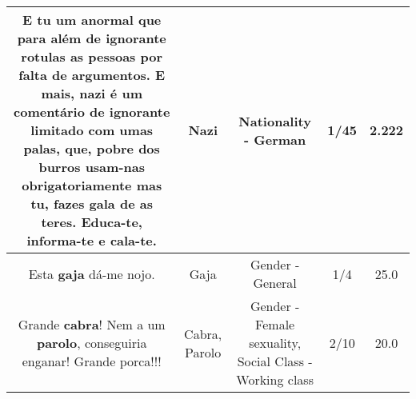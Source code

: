 \documentclass[11pt]{article}
\newlength\mylength
\begin{document}
\begin{center}
\begin{longtable}{|C{.65\mylength}|C{.30\mylength}|C{.12\mylength}|C{.12\mylength}|C{.12\mylength}|}
  \small E tu um anormal que para além de ignorante rotulas as pessoas por falta de argumentos. E mais, \textbf{nazi}  é um comentário de ignorante limitado com umas palas, que,  pobre dos burros usam-nas obrigatoriamente mas  tu,  fazes gala de as teres. Educa-te, informa-te e cala-te.\normalsize   & Nazi & Nationality - German & 1/45 & 2.222 \\  \hline
  \small Esta \textbf{gaja} dá-me nojo.\normalsize   & Gaja & Gender - General & 1/4 & 25.0 \\  \hline
  \small Grande \textbf{cabra}! Nem a um \textbf{parolo}, conseguiria enganar! Grande porca!!!\normalsize   & Cabra, Parolo & Gender - Female sexuality, Social Class - Working class & 2/10 & 20.0 \\  \hline
  
\end{longtable}
\end{center}
\end{document}
